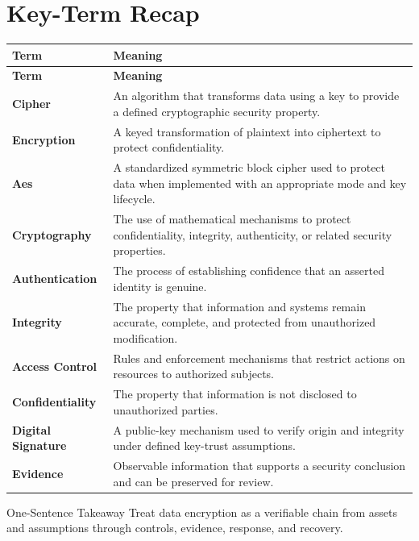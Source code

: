 \documentclass[11pt,letterpaper]{article}
\begin{document}
\section*{Key-Term Recap}
\begin{longtable}{>{\raggedright\arraybackslash}p{}>{\raggedright\arraybackslash}p{}}
\toprule\rowcolor{Navy}\color{white}\textbf{Term} & \color{white}\textbf{Meaning}\\\midrule
\endfirsthead
\toprule\rowcolor{Navy}\color{white}\textbf{Term} & \color{white}\textbf{Meaning}\\\midrule
\endhead
\textbf{Cipher} & An algorithm that transforms data using a key to provide a defined cryptographic security property. \\\midrule
\textbf{Encryption} & A keyed transformation of plaintext into ciphertext to protect confidentiality. \\\midrule
\textbf{Aes} & A standardized symmetric block cipher used to protect data when implemented with an appropriate mode and key lifecycle. \\\midrule
\textbf{Cryptography} & The use of mathematical mechanisms to protect confidentiality, integrity, authenticity, or related security properties. \\\midrule
\textbf{Authentication} & The process of establishing confidence that an asserted identity is genuine. \\\midrule
\textbf{Integrity} & The property that information and systems remain accurate, complete, and protected from unauthorized modification. \\\midrule
\textbf{Access Control} & Rules and enforcement mechanisms that restrict actions on resources to authorized subjects. \\\midrule
\textbf{Confidentiality} & The property that information is not disclosed to unauthorized parties. \\\midrule
\textbf{Digital Signature} & A public-key mechanism used to verify origin and integrity under defined key-trust assumptions. \\\midrule
\textbf{Evidence} & Observable information that supports a security conclusion and can be preserved for review. \\\midrule
\bottomrule
\end{longtable}
\begin{CornellExamBox}{One-Sentence Takeaway}
Treat data encryption as a verifiable chain from assets and assumptions through controls, evidence, response, and recovery.
\end{CornellExamBox}
\end{document}
